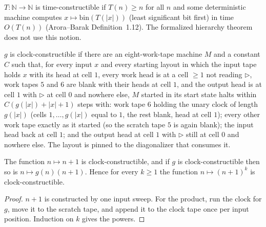 \begin{definition}
  \label{def:models-time-constructible}
  \leanok
  $T : \mathbb{N} \to \mathbb{N}$ is time-constructible if $T(n) \ge n$ for all
  $n$ and some deterministic machine computes $x \mapsto \mathrm{bin}(T(|x|))$
  (least significant bit first) in time $O(T(n))$ (Arora--Barak
  Definition~1.12). The formalized hierarchy theorem does not use this notion.
\end{definition}

\begin{definition}
  \label{def:models-clock-constructible}
  \leanok
  $g$ is clock-constructible if there are an eight-work-tape machine $M$ and a
  constant $C$ such that, for every input $x$ and every starting layout in
  which the input tape holds $x$ with its head at cell $1$, every work head is
  at a cell $\ge 1$ not reading $\triangleright$, work tapes $5$ and $6$ are
  blank with their heads at cell $1$, and the output head is at cell $1$ with
  $\triangleright$ at cell $0$ and nowhere else, $M$ started in its start state
  halts within $C (g(|x|) + |x| + 1)$ steps with: work tape $6$ holding the
  unary clock of length $g(|x|)$ (cells $1, \dots, g(|x|)$ equal to $1$, the
  rest blank, head at cell $1$); every other work tape exactly as it started
  (so the scratch tape $5$ is again blank); the input head back at cell $1$;
  and the output head at cell $1$ with $\triangleright$ still at cell $0$ and
  nowhere else. The layout is pinned to the diagonalizer that consumes it.
\end{definition}

\begin{lemma}
  \label{lem:models-clock-pow}
  \leanok
  The function $n \mapsto n + 1$ is clock-constructible, and if $g$ is
  clock-constructible then so is $n \mapsto g(n)(n+1)$. Hence for every
  $k \ge 1$ the function $n \mapsto (n+1)^k$ is clock-constructible.
\end{lemma}
\begin{proof}
  \leanok
  $n + 1$ is constructed by one input sweep. For the product, run the clock
  for $g$, move it to the scratch tape, and append it to the clock tape once
  per input position. Induction on $k$ gives the powers.
\end{proof}

